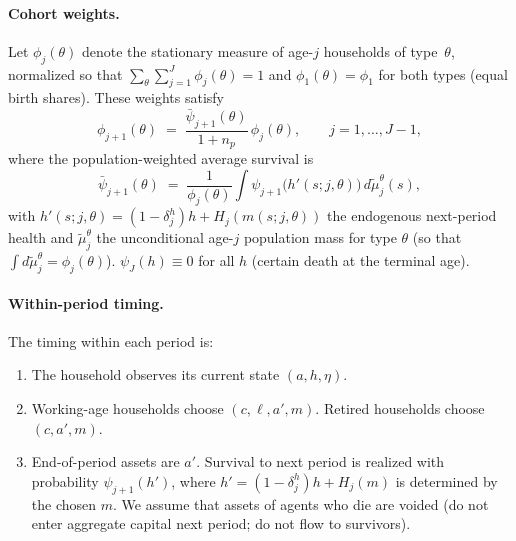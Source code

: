\documentclass[12pt,a4paper]{article}
\begin{document}
\paragraph{Cohort weights.}
Let $\phi_j(\theta)$ denote the stationary measure of age-$j$ households of type~$\theta$, normalized so that $\sum_\theta \sum_{j=1}^{J} \phi_j(\theta) = 1$ and $\phi_1(\theta) = \phi_1$ for both types (equal birth shares). These weights satisfy
\begin{equation}
\label{eq:cohort_weights}
\phi_{j+1}(\theta) \;=\; \frac{\bar{\psi}_{j+1}(\theta)}{1 + n_p}\, \phi_j(\theta), \qquad j = 1, \ldots, J-1,
\end{equation}
where the population-weighted average survival is
\begin{equation}
\label{eq:avg_survival}
\bar{\psi}_{j+1}(\theta)
\;=\;
\frac{1}{\phi_j(\theta)} \int \psi_{j+1}\bigl(h'(s; j, \theta)\bigr)\, d\tilde\mu_j^\theta(s),
\end{equation}
with $h'(s; j, \theta) = (1-\delta_j^h)h + H_j(m(s; j, \theta))$ the endogenous next-period health and $\tilde\mu_j^\theta$ the unconditional age-$j$ population mass for type $\theta$ (so that $\int d\tilde\mu_j^\theta = \phi_j(\theta)$). $\psi_J(h) \equiv 0$ for all $h$ (certain death at the terminal age).
 

\paragraph{Within-period timing.}
The timing within each period is:
\begin{enumerate}
\item The household observes its current state $(a, h, \eta)$.
\item Working-age households choose $(c, \ell, a', m)$. Retired households choose $(c, a', m)$.
\item End-of-period assets are $a'$. Survival to next period is realized with probability $\psi_{j+1}(h')$, where $h' = (1-\delta_j^h) h + H_j(m)$ is determined by the chosen $m$. We assume that assets of agents who die are voided (do not enter aggregate capital next period; do not flow to survivors).
\end{enumerate}
\end{document}
